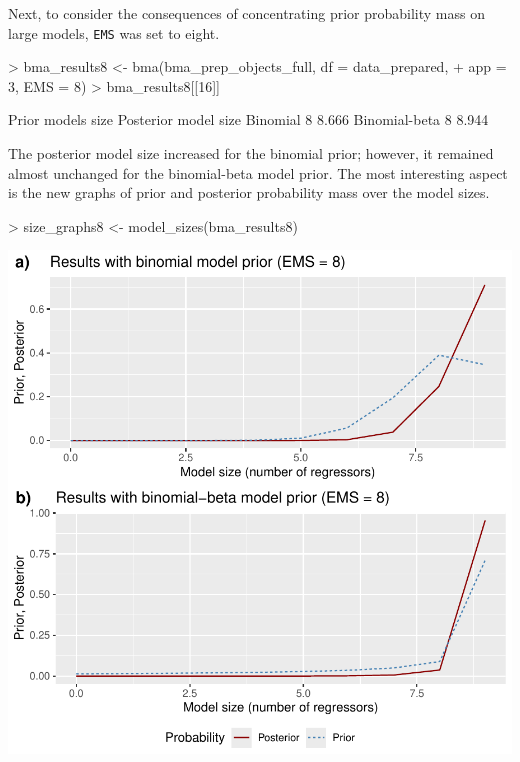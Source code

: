\documentclass[a4paper]{article}
\begin{document}
Next, to consider the consequences of concentrating prior probability mass on large models, \verb+EMS+ was set to eight.
\begin{Schunk}
\begin{Sinput}
> bma_results8 <- bma(bma_prep_objects_full, df = data_prepared,
+                     app = 3, EMS = 8)
> bma_results8[[16]]
\end{Sinput}
\begin{Soutput}
              Prior models size Posterior model size
Binomial                      8                8.666
Binomial-beta                 8                8.944
\end{Soutput}
\end{Schunk}
The posterior model size increased for the binomial prior; however, it remained almost unchanged for the binomial-beta model prior. The most interesting aspect is the new graphs of prior and posterior probability mass over the model sizes.
\begin{Schunk}
\begin{Sinput}
> size_graphs8 <- model_sizes(bma_results8)
\end{Sinput}
\end{Schunk}
\includegraphics{bdsm_vignette-034}
\end{document}
